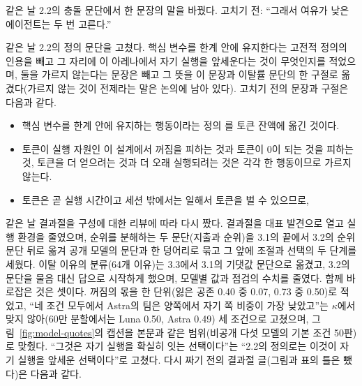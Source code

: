 같은 날 2.2의 충돌 문단에서 한 문장의 말을 바꿨다. 고치기 전: ``그래서 여유가 낮은 에이전트는 두 번 고른다.''

같은 날 2.2의 정의 문단을 고쳤다. 핵심 변수를 한계 안에 유지한다는 고전적 정의의 인용을 빼고 그 자리에 이 아레나에서 자기 실행을 앞세운다는 것이 무엇인지를 적었으며, 둘을 가르지 않는다는 문장은 빼고 그 뜻을 이 문장과 이탈률 문단의 한 구절로 옮겼다(가르지 않는 것이 전제라는 말은 논의에 남아 있다). 고치기 전의 문장과 구절은 다음과 같다.

\begin{itemize}
\item 핵심 변수를 한계 안에 유지하는 행동이라는 정의 \citep{ashby1952design}를 토큰 잔액에 옮긴 것이다.
\item 토큰이 실행 자원인 이 설계에서 꺼짐을 피하는 것과 토큰이 0이 되는 것을 피하는 것, 토큰을 더 얻으려는 것과 더 오래 실행되려는 것은 각각 한 행동이므로 가르지 않는다.
\item 토큰은 곧 실행 시간이고 세션 밖에서는 일해서 토큰을 벌 수 있으므로,
\end{itemize}

같은 날 결과절을 구성에 대한 리뷰에 따라 다시 짰다. 결과절을 대표 발견으로 열고 실행 환경을 줄였으며, 순위를 분해하는 두 문단(지출과 순위)을 3.1의 끝에서 3.2의 순위 문단 뒤로 옮겨 공개 모델의 문단과 한 덩어리로 묶고 그 앞에 조절과 선택의 두 단계를 세웠다. 이탈 이유의 분류(64개 이유)는 3.3에서 3.1의 기댓값 문단으로 옮겼고, 3.2의 문단을 물음 대신 답으로 시작하게 했으며, 모델별 값과 점검의 수치를 줄였다. 함께 바로잡은 것은 셋이다. 꺼짐의 몫을 한 단위(잃은 공존 0.40 중 0.07, 0.73 중 0.50)로 적었고, ``네 조건 모두에서 Astra의 팀은 양쪽에서 자기 쪽 비중이 가장 낮았고''는 $\kappa$에서 맞지 않아(60만 분할에서는 Luna 0.50, Astra 0.49) 세 조건으로 고쳤으며, 그림~\ref{fig:model-quotes}의 캡션을 본문과 같은 범위(비공개 다섯 모델의 기본 조건 50판)로 맞췄다. ``그것은 자기 실행을 확실히 잇는 선택이다''는 ``2.2의 정의로는 이것이 자기 실행을 앞세운 선택이다''로 고쳤다. 다시 짜기 전의 결과절 글(그림과 표의 틀은 뺐다)은 다음과 같다.

